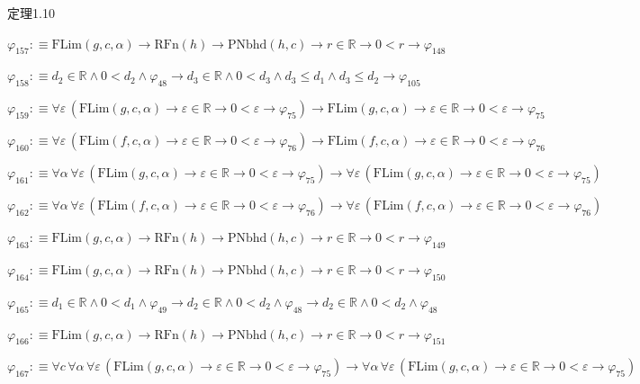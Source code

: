 \begin{fullproof}{定理1.10}
\begin{abbrevlist}
\item $\varphi_{157} :\equiv \mathrm{FLim}(g,c,\alpha) \to \mathrm{RFn}(h) \to \mathrm{PNbhd}(h,c) \to r \in \mathbb{R} \to 0 < r \to \varphi_{148}$
\item $\varphi_{158} :\equiv d_{2} \in \mathbb{R} \land 0 < d_{2} \land \varphi_{48} \to d_{3} \in \mathbb{R} \land 0 < d_{3} \land d_{3} \leq d_{1} \land d_{3} \leq d_{2} \to \varphi_{105}$
\item $\varphi_{159} :\equiv \forall \varepsilon\,(\mathrm{FLim}(g,c,\alpha) \to \varepsilon \in \mathbb{R} \to 0 < \varepsilon \to \varphi_{75}) \to \mathrm{FLim}(g,c,\alpha) \to \varepsilon \in \mathbb{R} \to 0 < \varepsilon \to \varphi_{75}$
\item $\varphi_{160} :\equiv \forall \varepsilon\,(\mathrm{FLim}(f,c,\alpha) \to \varepsilon \in \mathbb{R} \to 0 < \varepsilon \to \varphi_{76}) \to \mathrm{FLim}(f,c,\alpha) \to \varepsilon \in \mathbb{R} \to 0 < \varepsilon \to \varphi_{76}$
\item $\varphi_{161} :\equiv \forall \alpha\,\forall \varepsilon\,(\mathrm{FLim}(g,c,\alpha) \to \varepsilon \in \mathbb{R} \to 0 < \varepsilon \to \varphi_{75}) \to \forall \varepsilon\,(\mathrm{FLim}(g,c,\alpha) \to \varepsilon \in \mathbb{R} \to 0 < \varepsilon \to \varphi_{75})$
\item $\varphi_{162} :\equiv \forall \alpha\,\forall \varepsilon\,(\mathrm{FLim}(f,c,\alpha) \to \varepsilon \in \mathbb{R} \to 0 < \varepsilon \to \varphi_{76}) \to \forall \varepsilon\,(\mathrm{FLim}(f,c,\alpha) \to \varepsilon \in \mathbb{R} \to 0 < \varepsilon \to \varphi_{76})$
\item $\varphi_{163} :\equiv \mathrm{FLim}(g,c,\alpha) \to \mathrm{RFn}(h) \to \mathrm{PNbhd}(h,c) \to r \in \mathbb{R} \to 0 < r \to \varphi_{149}$
\item $\varphi_{164} :\equiv \mathrm{FLim}(g,c,\alpha) \to \mathrm{RFn}(h) \to \mathrm{PNbhd}(h,c) \to r \in \mathbb{R} \to 0 < r \to \varphi_{150}$
\item $\varphi_{165} :\equiv d_{1} \in \mathbb{R} \land 0 < d_{1} \land \varphi_{49} \to d_{2} \in \mathbb{R} \land 0 < d_{2} \land \varphi_{48} \to d_{2} \in \mathbb{R} \land 0 < d_{2} \land \varphi_{48}$
\item $\varphi_{166} :\equiv \mathrm{FLim}(g,c,\alpha) \to \mathrm{RFn}(h) \to \mathrm{PNbhd}(h,c) \to r \in \mathbb{R} \to 0 < r \to \varphi_{151}$
\item $\varphi_{167} :\equiv \forall c\,\forall \alpha\,\forall \varepsilon\,(\mathrm{FLim}(g,c,\alpha) \to \varepsilon \in \mathbb{R} \to 0 < \varepsilon \to \varphi_{75}) \to \forall \alpha\,\forall \varepsilon\,(\mathrm{FLim}(g,c,\alpha) \to \varepsilon \in \mathbb{R} \to 0 < \varepsilon \to \varphi_{75})$

\end{abbrevlist}
\end{fullproof}
